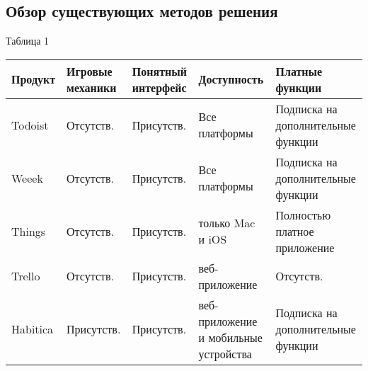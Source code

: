 \documentclass[../document.tex]{subfiles}
\begin{document}
\subsection{Обзор существующих методов решения}
\begin{flushright}
    Таблица 1
\end{flushright}
\par
\begin{tabular}{ | m{5em} | m{5em} | m{5em} | m{5em} | m{5em} | }
    \hline
    Продукт  & Игровые механики & Понятный интерфейс & Доступность                           & Платные функции                    \\
    \hline
    Todoist  & Отсутств.        & Присутств.         & Все платформы                         & Подписка на дополнительные функции \\
    \hline
    Weeek    & Отсутств.        & Присутств.         & Все платформы                         & Подписка на дополнительные функции \\
    \hline
    Things   & Отсутств.        & Присутств.         & только Mac и iOS                      & Полностью платное приложение       \\
    \hline
    Trello   & Отсутств.        & Присутств.         & веб-приложение                        & Отсутств.                          \\
    \hline
    Habitica & Присутств.       & Присутств.         & веб-приложение и мобильные устройства & Подписка на дополнительные функции \\
    \hline
\end{tabular}
\pagebreak
\end{document}
